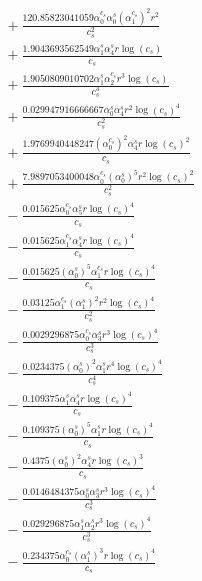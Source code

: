 \documentclass[10pt]{article}
\begin{document}
\begin{align*}
&{}  + \frac{120.85823041059 \alpha_{0}^{c_s} \alpha_{0}^s \left(\alpha_{1}^{c_s}\right)^{2} r^{2}}{c_{s}^{2}} \\
&{}  + \frac{1.9043693562549 \alpha_{1}^s \alpha_{4}^s r \log{\left(c_{s} \right)}}{c_{s}} \\
&{}  + \frac{1.9050809010702 \alpha_{1}^s \alpha_{2}^{c_s} r^{3} \log{\left(c_{s} \right)}}{c_{s}^{3}} \\
&{}  + \frac{0.029947916666667 \alpha_{0}^s \alpha_{4}^s r^{2} \log{\left(c_{s} \right)}^{4}}{c_{s}^{2}} \\
&{}  + \frac{1.9769940448247 \left(\alpha_{0}^{c_s}\right)^{2} \alpha_{4}^s r \log{\left(c_{s} \right)}^{2}}{c_{s}} \\
&{}  + \frac{7.9897053400048 \alpha_{0}^{c_s} \left(\alpha_{0}^s\right)^{5} r^{2} \log{\left(c_{s} \right)}^{2}}{c_{s}^{2}} \\
&{}  - \frac{0.015625 \alpha_{0}^{c_s} \alpha_{5}^s r \log{\left(c_{s} \right)}^{4}}{c_{s}} \\
&{}  - \frac{0.015625 \alpha_{1}^{c_s} \alpha_{4}^s r \log{\left(c_{s} \right)}^{4}}{c_{s}} \\
&{}  - \frac{0.015625 \left(\alpha_{0}^s\right)^{5} \alpha_{1}^{c_s} r \log{\left(c_{s} \right)}^{4}}{c_{s}} \\
&{}  - \frac{0.03125 \alpha_{1}^{c_s} \left(\alpha_{1}^s\right)^{2} r^{2} \log{\left(c_{s} \right)}^{4}}{c_{s}^{2}} \\
&{}  - \frac{0.0029296875 \alpha_{0}^{c_s} \alpha_{3}^s r^{3} \log{\left(c_{s} \right)}^{4}}{c_{s}^{3}} \\
&{}  - \frac{0.0234375 \left(\alpha_{0}^s\right)^{2} \alpha_{1}^s r^{4} \log{\left(c_{s} \right)}^{4}}{c_{s}^{4}} \\
&{}  - \frac{0.109375 \alpha_{1}^s \alpha_{4}^s r \log{\left(c_{s} \right)}^{4}}{c_{s}} \\
&{}  - \frac{0.109375 \left(\alpha_{0}^s\right)^{5} \alpha_{1}^s r \log{\left(c_{s} \right)}^{4}}{c_{s}} \\
&{}  - \frac{0.4375 \left(\alpha_{0}^s\right)^{2} \alpha_{4}^s r \log{\left(c_{s} \right)}^{3}}{c_{s}} \\
&{}  - \frac{0.0146484375 \alpha_{0}^s \alpha_{3}^s r^{3} \log{\left(c_{s} \right)}^{4}}{c_{s}^{3}} \\
&{}  - \frac{0.029296875 \alpha_{1}^s \alpha_{2}^s r^{3} \log{\left(c_{s} \right)}^{4}}{c_{s}^{3}} \\
&{}  - \frac{0.234375 \alpha_{0}^{c_s} \left(\alpha_{1}^s\right)^{3} r \log{\left(c_{s} \right)}^{4}}{c_{s}} \\

\end{align*}
\end{document}
